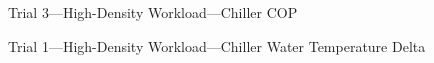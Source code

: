 \documentclass[10pt]{report}
\begin{document}
\begin{landscape}
\begin{figure}[!h]
    \caption{Trial 3---High-Density Workload---Chiller COP}
\end{figure}
\begin{figure}[!h]
  \centering

    \caption{Trial 1---High-Density Workload---Chiller Water Temperature Delta}
\end{figure}
\begin{figure}[!h]
  \centering


\end{figure}
\end{landscape}
\end{document}
